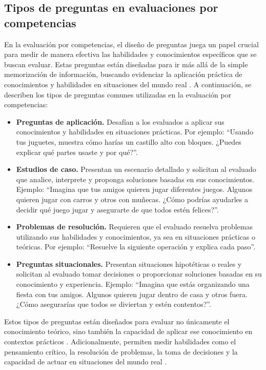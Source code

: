 \subsection{Tipos de preguntas en evaluaciones por competencias}

En la evaluación por competencias, el diseño de preguntas juega un papel crucial para medir de manera efectiva las habilidades y conocimientos específicos que se buscan evaluar. Estas preguntas están diseñadas para ir más allá de la simple memorización de información, buscando evidenciar la aplicación práctica de conocimientos y habilidades en situaciones del mundo real \cite{ref38_wiggins}. A continuación, se describen los tipos de preguntas comunes utilizadas en la evaluación por competencias:

\begin{itemize}[leftmargin=*]
\item \textbf{Preguntas de aplicación.} Desafían a los evaluados a aplicar sus conocimientos y habilidades en situaciones prácticas. Por ejemplo: ``Usando tus juguetes, muestra cómo harías un castillo alto con bloques. ¿Puedes explicar qué partes usaste y por qué?''.
\item \textbf{Estudios de caso.} Presentan un escenario detallado y solicitan al evaluado que analice, interprete y proponga soluciones basadas en sus conocimientos. Ejemplo: ``Imagina que tus amigos quieren jugar diferentes juegos. Algunos quieren jugar con carros y otros con muñecas. ¿Cómo podrías ayudarles a decidir qué juego jugar y asegurarte de que todos estén felices?''.
\item \textbf{Problemas de resolución.} Requieren que el evaluado resuelva problemas utilizando sus habilidades y conocimientos, ya sea en situaciones prácticas o teóricas. Por ejemplo: ``Resuelve la siguiente operación y explica cada paso''.
\item \textbf{Preguntas situacionales.} Presentan situaciones hipotéticas o reales y solicitan al evaluado tomar decisiones o proporcionar soluciones basadas en su conocimiento y experiencia. Ejemplo: ``Imagina que estás organizando una fiesta con tus amigos. Algunos quieren jugar dentro de casa y otros fuera. ¿Cómo asegurarías que todos se diviertan y estén contentos?''.
\end{itemize}

Estos tipos de preguntas están diseñados para evaluar no únicamente el conocimiento teórico, sino también la capacidad de aplicar ese conocimiento en contextos prácticos \cite{ref15_villardon}. Adicionalmente, permiten medir habilidades como el pensamiento crítico, la resolución de problemas, la toma de decisiones y la capacidad de actuar en situaciones del mundo real \cite{ref18_brown}.

